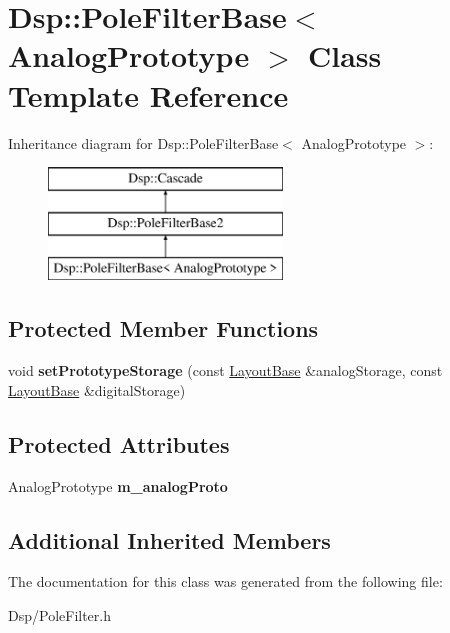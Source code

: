 \hypertarget{classDsp_1_1PoleFilterBase}{\section{Dsp\-:\-:Pole\-Filter\-Base$<$ Analog\-Prototype $>$ Class Template Reference}
\label{classDsp_1_1PoleFilterBase}
}
Inheritance diagram for Dsp\-:\-:Pole\-Filter\-Base$<$ Analog\-Prototype $>$\-:\begin{figure}[H]
\begin{center}
\leavevmode
\includegraphics[height=3.000000cm]{classDsp_1_1PoleFilterBase}
\end{center}
\end{figure}
\subsection*{Protected Member Functions}
\begin{DoxyCompactItemize}
\item 
\hypertarget{classDsp_1_1PoleFilterBase_a5776ae755ef939d36c6fe54ab1c753ca}{void {\bfseries set\-Prototype\-Storage} (const \hyperlink{classDsp_1_1LayoutBase}{Layout\-Base} \&analog\-Storage, const \hyperlink{classDsp_1_1LayoutBase}{Layout\-Base} \&digital\-Storage)}\label{classDsp_1_1PoleFilterBase_a5776ae755ef939d36c6fe54ab1c753ca}

\end{DoxyCompactItemize}
\subsection*{Protected Attributes}
\begin{DoxyCompactItemize}
\item 
\hypertarget{classDsp_1_1PoleFilterBase_ae21673f49f16d29a7c016bdc96196fda}{Analog\-Prototype {\bfseries m\-\_\-analog\-Proto}}\label{classDsp_1_1PoleFilterBase_ae21673f49f16d29a7c016bdc96196fda}

\end{DoxyCompactItemize}
\subsection*{Additional Inherited Members}


The documentation for this class was generated from the following file\-:\begin{DoxyCompactItemize}
\item 
Dsp/Pole\-Filter.\-h\end{DoxyCompactItemize}
